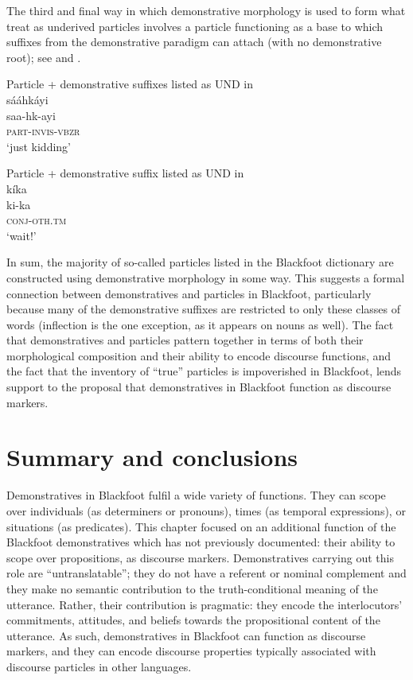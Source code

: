 \documentclass[output=paper,colorlinks,citecolor=brown]{langscibook}
\begin{document}
The third and final way in which demonstrative morphology is used to form what \citet{FrantzRussell1995} treat as underived particles involves a particle functioning as a base to which suffixes from the demonstrative paradigm can attach (with no demonstrative root); see  and .

\ea\label{ex:bliss:28} {Particle + demonstrative suffixes listed as UND in \citet{FrantzRussell1995}}\\
sááhkáyi\\
\gll saa-hk-ayi\footnotemark{}\\
     \textsc{part-invis-vbzr}\\
\glt ‘just kidding’
\z
{}

\ea\label{ex:bliss:29} {Particle + demonstrative suffix listed as UND in \citet{FrantzRussell1995}}\\
kíka\\
\gll ki-ka\footnotemark{}\\
     \textsc{conj-oth.tm}\\
\glt ‘wait!’
\z
{}

In sum, the majority of so-called particles listed in the Blackfoot dictionary are constructed using demonstrative morphology in some way. This suggests a formal connection between demonstratives and particles in Blackfoot, particularly because many of the demonstrative suffixes are restricted to only these classes of words (inflection is the one exception, as it appears on nouns as well). The fact that demonstratives and particles pattern together in terms of both their morphological composition and their ability to encode discourse functions, and the fact that the inventory of “true” particles is impoverished in Blackfoot, lends support to the proposal that demonstratives in Blackfoot function as discourse markers. 

\section{Summary and conclusions}\label{sec:bliss:6}

Demonstratives in Blackfoot fulfil a wide variety of functions. They can scope over individuals (as determiners or pronouns), times (as temporal expressions), or situations (as predicates). This chapter focused on an additional function of the Blackfoot demonstratives which has not previously documented: their ability to scope over propositions, as discourse markers. Demonstratives carrying out this role are “untranslatable”; they do not have a referent or nominal complement and they make no semantic contribution to the truth-conditional meaning of the utterance. Rather, their contribution is pragmatic: they encode the interlocutors’ commitments, attitudes, and beliefs towards the propositional content of the utterance. As such, demonstratives in Blackfoot can function as discourse markers, and they can encode discourse properties typically associated with discourse particles in other languages. 
\end{document}
